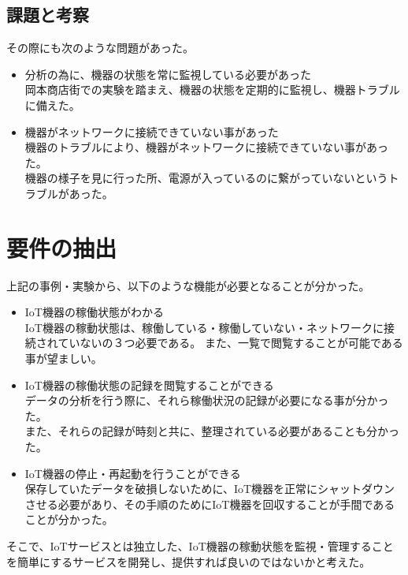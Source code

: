 \subsection{課題と考察}
その際にも次のような問題があった。
\begin{itemize}
	\item 分析の為に、機器の状態を常に監視している必要があった\\
		岡本商店街での実験を踏まえ、機器の状態を定期的に監視し、機器トラブルに備えた。
	\item 機器がネットワークに接続できていない事があった\\
		機器のトラブルにより、機器がネットワークに接続できていない事があった。\\
		機器の様子を見に行った所、電源が入っているのに繋がっていないというトラブルがあった。
\end{itemize}

\section{要件の抽出}
上記の事例・実験から、以下のような機能が必要となることが分かった。

\begin{itemize}
\item IoT機器の稼働状態がわかる\\
	IoT機器の稼動状態は、稼働している・稼働していない・ネットワークに接続されていないの３つ必要である。
	また、一覧で閲覧することが可能である事が望ましい。
\item IoT機器の稼働状態の記録を閲覧することができる\\
	データの分析を行う際に、それら稼働状況の記録が必要になる事が分かった。\\
	また、それらの記録が時刻と共に、整理されている必要があることも分かった。
\item IoT機器の停止・再起動を行うことができる\\
	保存していたデータを破損しないために、IoT機器を正常にシャットダウンさせる必要があり、その手順のためにIoT機器を回収することが手間であることが分かった。
\end{itemize}

そこで、IoTサービスとは独立した、IoT機器の稼動状態を監視・管理することを簡単にするサービスを開発し、提供すれば良いのではないかと考えた。




